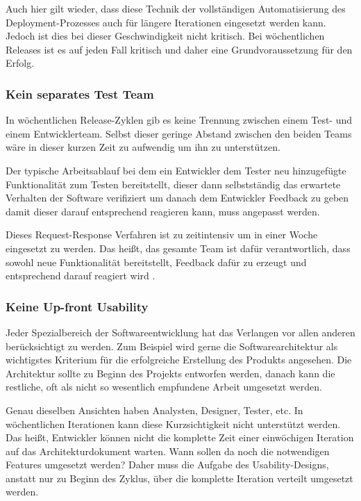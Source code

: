 Auch hier gilt wieder, dass diese Technik der vollständigen Automatisierung des Deployment-Prozesses auch für längere Iterationen eingesetzt werden kann. Jedoch ist dies bei dieser Geschwindigkeit nicht kritisch. Bei wöchentlichen Releases ist es auf jeden Fall kritisch und daher eine Grundvoraussetzung für den Erfolg.

\subsubsection{Kein separates Test Team}
In wöchentlichen Release-Zyklen gib es keine Trennung zwischen einem Test- und einem Entwicklerteam. Selbst dieser geringe Abstand zwischen den beiden Teams wäre in dieser kurzen Zeit zu aufwendig um ihn zu unterstützen. 

Der typische Arbeitsablauf bei dem ein Entwickler dem Tester neu hinzugefügte Funktionalität zum Testen bereitstellt, dieser dann selbstständig das erwartete Verhalten der Software verifiziert um danach dem Entwickler Feedback zu geben damit dieser darauf entsprechend reagieren kann, muss angepasst werden. 

Dieses Request-Response Verfahren ist zu zeitintensiv um in einer Woche eingesetzt zu werden. Das heißt, das gesamte Team ist dafür verantwortlich, dass sowohl neue Funktionalität bereitstellt, Feedback dafür zu erzeugt und entsprechend darauf reagiert wird \cite{crispin2008}.

\subsubsection{Keine Up-front Usability}
Jeder Spezialbereich der Softwareentwicklung hat das Verlangen vor allen anderen berücksichtigt zu werden. Zum Beispiel wird gerne die Softwarearchitektur als wichtigstes Kriterium für die erfolgreiche Erstellung des Produkts angesehen. Die Architektur sollte zu Beginn des Projekts entworfen werden, danach kann die restliche, oft als nicht so wesentlich empfundene Arbeit umgesetzt werden. 

Genau dieselben Ansichten haben Analysten, Designer, Tester, etc. In wöchentlichen Iterationen kann diese Kurzsichtigkeit nicht unterstützt werden. Das heißt, Entwickler können nicht die komplette Zeit einer einwöchigen Iteration auf das Architekturdokument warten. Wann sollen da noch die notwendigen Features umgesetzt werden? 
Daher muss die Aufgabe des Usability-Designs, anstatt nur zu Beginn des Zyklus, über die komplette Iteration verteilt umgesetzt werden.

